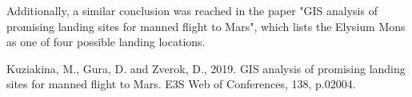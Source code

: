 \documentclass{article}
\begin{document}
Additionally, a similar conclusion was reached in the paper "GIS analysis of promising landing sites for manned flight to Mars", which lists the Elysium Mons as one of four possible landing locations. \cite{dmtri}


\begin{thebibliography}{1}
    Kuziakina, M., Gura, D. and Zverok, D., 2019. GIS analysis of promising landing sites for manned flight to Mars. E3S Web of Conferences, 138, p.02004.
\end{thebibliography}
    
\end{document}
